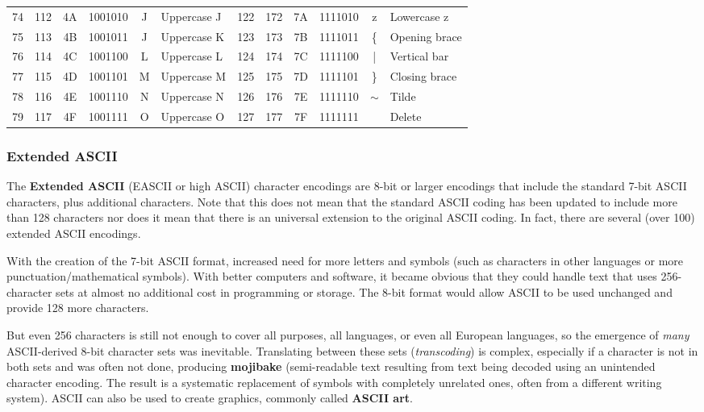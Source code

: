 \documentclass[a4paper, 12pt]{report}
\theoremstyle{remark}
\theoremstyle{definition}
\begin{document}
{\begin{tabular}{ |c|c|c|c|c|l|c|c|c|c|c|l| }
74 & 112 & 4A& 1001010 &J&Uppercase J & 122 & 172 & 7A& 1111010 &z&Lowercase z\\
75 & 113 & 4B& 1001011 &J&Uppercase K & 123 & 173 & 7B& 1111011 &\{& Opening brace\\
76 & 114 & 4C& 1001100 &L&Uppercase L & 124 & 174 & 7C& 1111100 &|& Vertical bar\\
77 & 115 & 4D& 1001101 &M&Uppercase M & 125 & 175 & 7D& 1111101 &\}& Closing brace\\
78 & 116 & 4E& 1001110 &N&Uppercase N & 126 & 176 & 7E& 1111110 & $\sim$ & Tilde\\
79 & 117 & 4F& 1001111 &O&Uppercase O & 127 & 177 & 7F& 1111111 & & Delete\\
 \hline
\end{tabular}}

\subsubsection{Extended ASCII}
The \textbf{Extended ASCII} (EASCII or high ASCII) character encodings are 8-bit or larger encodings that include the standard 7-bit ASCII characters, plus additional characters. Note that this does not mean that the standard ASCII coding has been updated to include more than 128 characters nor does it mean that there is an universal extension to the original ASCII coding. In fact, there are several (over 100) extended ASCII encodings. 

With the creation of the 7-bit ASCII format, increased need for more letters and symbols (such as characters in other languages or more punctuation/mathematical symbols). With better computers and software, it became obvious that they could handle text that uses 256-character sets at almost no additional cost in programming or storage. The 8-bit format would allow ASCII to be used unchanged and provide 128 more characters. 

But even 256 characters is still not enough to cover all purposes, all languages, or even all European languages, so the emergence of \textit{many} ASCII-derived 8-bit character sets was inevitable. Translating between these sets (\textit{transcoding}) is complex, especially if a character is not in both sets and was often not done, producing \textbf{mojibake} (semi-readable text resulting from text being decoded using an unintended character encoding. The result is a systematic replacement of symbols with completely unrelated ones, often from a different writing system). ASCII can also be used to create graphics, commonly called \textbf{ASCII art}. 
\end{document}
